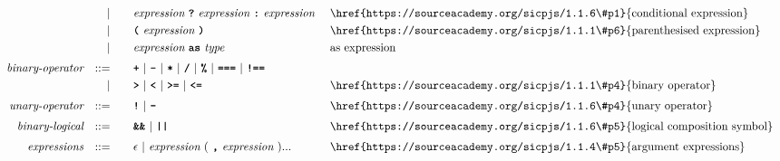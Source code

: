 \begin{alignat*}{9}
&&                       && |   &\quad &&   \textit{expression} \ \textbf{\texttt{?}}\ 
                                            \textit{expression}
                                            \ \textbf{\texttt{:}}\
                                            \textit{expression}\
                                                           && \textrm{\href{https://sourceacademy.org/sicpjs/1.1.6\#p1}{conditional expression}}\\
&&                       && |   &\quad &&  \textbf{\texttt{(}}\  \textit{expression} \ 
                                            \textbf{\texttt{)}} && \textrm{\href{https://sourceacademy.org/sicpjs/1.1.1\#p6}{parenthesised expression}}\\
&&                       && |   &\quad &&  \textit{expression} \ \textbf{\texttt{as}}\ \textit{type} 
                                            && \textrm{as expression}\\[1mm]
&& \textit{binary-operator}   
                        && ::= &\quad && \textbf{\texttt{+}}\ |\ \textbf{\texttt{-}}\ |\ \textbf{\texttt{*}}\ |\ \textbf{\texttt{/}}\ |\ \textbf{\texttt{\%}}\ |\ 
                                            \textbf{\texttt{===}}\ |\ \textbf{\texttt{!==}} \\
&&                      && |  &\quad &&  \texttt{\textbf{>}}\ |\ \texttt{\textbf{<}}\ |\ \texttt{\textbf{>=}}\ |\ \texttt{\textbf{<=}}     && \textrm{\href{https://sourceacademy.org/sicpjs/1.1.1\#p4}{binary operator}}\\[1mm]
&& \textit{unary-operator}    
                        && ::= &\quad && \textbf{\texttt{!}}\ |\ \textbf{\texttt{-}}
                        && \textrm{\href{https://sourceacademy.org/sicpjs/1.1.6\#p4}{unary operator}}\\[1mm]
&& \textit{binary-logical}   && ::=  &\quad &&  \textbf{\texttt{\&\&}}\ |\ \texttt{\textbf{||}}
                                          && \textrm{\href{https://sourceacademy.org/sicpjs/1.1.6\#p5}{logical composition symbol}}\\[1mm]
&& \textit{expressions}  && ::= &\quad && \epsilon\ | \ \textit{expression}\ (
                                                               \ \textbf{\texttt{,}} \
                                                                 \textit{expression} \ 
                                                                      ) ...
                                                            && \textrm{\href{https://sourceacademy.org/sicpjs/1.1.4\#p5}{argument expressions}}\\[1mm]

\end{alignat*}
